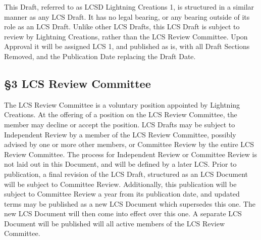 \documentclass[
]{article}
\begin{document}
This Draft, referred to as LCSD Lightning Creations 1, is structured in
a similar manner as any LCS Draft. It has no legal bearing, or any
bearing outside of its role as an LCS Draft. Unlike other LCS Drafts,
this LCS Draft is subject to review by Lightning Creations, rather than
the LCS Review Committee. Upon Approval it will be assigned LCS 1, and
published as is, with all Draft Sections Removed, and the Publication
Date replacing the Draft Date.

\hypertarget{lcs-review-committee}{%
\subsection{§3 LCS Review Committee}\label{lcs-review-committee}}

The LCS Review Committee is a voluntary position appointed by Lightning
Creations. At the offering of a position on the LCS Review Committee,
the member may decline or accept the position. LCS Drafts may be subject
to Independent Review by a member of the LCS Review Committee, possibly
advised by one or more other members, or Committee Review by the entire
LCS Review Committee. The process for Independent Review or Committee
Review is not laid out in this Document, and will be defined by a later
LCS. Prior to publication, a final revision of the LCS Draft, structured
as an LCS Document will be subject to Committee Review. Additionally,
this publication will be subject to Committee Review a year from its
publication date, and updated terms may be published as a new LCS
Document which supersedes this one. The new LCS Document will then come
into effect over this one. A separate LCS Document will be published
will all active members of the LCS Review Committee.
\end{document}
